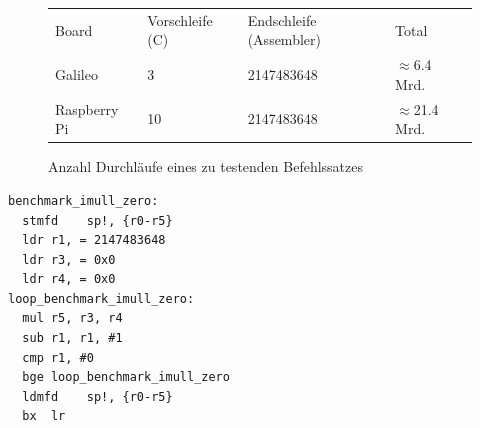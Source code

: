 \begin{figure}[H]
\center
\begin{tabular}{ |l|l|l|l| }
\hline
Board & Vorschleife (C) & Endschleife (Assembler) & Total \\ \hhline{|=|=|=|=|}
Galileo & 3 & 2147483648 & $\approx$6.4 Mrd.  \\ \hline
Raspberry Pi & 10 & 2147483648 & $\approx$21.4 Mrd. \\ \hline
\end{tabular}
\caption{Anzahl Durchläufe eines zu testenden Befehlssatzes}
\label{fig:benchmark_loop_size}
\end{figure}



\begin{minipage}{\linewidth}
\lstset{language=[x64]Assembler}
\begin{lstlisting}[label={list:asm_benchmark},caption={Benchmark in Assembler}]
benchmark_imull_zero:
  stmfd    sp!, {r0-r5}
  ldr r1, = 2147483648
  ldr r3, = 0x0
  ldr r4, = 0x0
loop_benchmark_imull_zero:
  mul r5, r3, r4
  sub r1, r1, #1
  cmp r1, #0
  bge loop_benchmark_imull_zero
  ldmfd    sp!, {r0-r5}
  bx  lr
\end{lstlisting}
\end{minipage}


